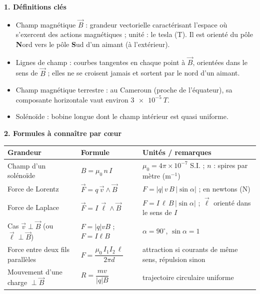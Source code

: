 \documentclass[11pt]{article}
\newcommand{\cle}[1]{{\popxbold\color{popdark}#1}}
\begin{document}
\begin{bilan}
\textbf{1. Définitions clés}
\begin{itemize}
  \item \cle{Champ magnétique} $\vec{B}$ : grandeur vectorielle caractérisant l'espace où s'exercent des actions magnétiques ; unité : le \cle{tesla} (T). Il est orienté du pôle \textbf{N}ord vers le pôle \textbf{S}ud d'un aimant (à l'extérieur).
  \item \cle{Lignes de champ} : courbes tangentes en chaque point à $\vec{B}$, orientées dans le sens de $\vec{B}$ ; elles ne se croisent jamais et sortent par le nord d'un aimant.
  \item \cle{Champ magnétique terrestre} : au Cameroun (proche de l'équateur), sa composante horizontale vaut environ $\SI{3e-5}{T}$.
  \item \cle{Solénoïde} : bobine longue dont le champ intérieur est quasi uniforme.
\end{itemize}

\textbf{2. Formules à connaître par c\oe ur}
\begin{center}
\begin{tabularx}{\linewidth}{|l|X|X|}
\hline
\rowcolor{popblueL} \textbf{Grandeur} & \textbf{Formule} & \textbf{Unités / remarques} \\
\hline
Champ d'un solénoïde & $B=\mu_0\,n\,I$ & $\mu_0=4\pi\times10^{-7}$ S.I. ; $n$ : spires par mètre ($\mathrm{m^{-1}}$) \\
\hline
Force de Lorentz & $\vec{F}=q\,\vec{v}\wedge\vec{B}$ & $F=|q|\,v\,B\,|\sin\alpha|$ ; en newtons (N) \\
\hline
Force de Laplace & $\vec{F}=I\,\vec{\ell}\wedge\vec{B}$ & $F=I\,\ell\,B\,|\sin\alpha|$ ; $\vec{\ell}$ orienté dans le sens de $I$ \\
\hline
Cas $\vec{v}\perp\vec{B}$ (ou $\vec{\ell}\perp\vec{B}$) & $F=|q|vB$ \quad ; \quad $F=I\ell B$ & $\alpha=90^{\circ}$, $\sin\alpha=1$ \\
\hline
Force entre deux fils parallèles & $F=\dfrac{\mu_0\,I_1 I_2\,\ell}{2\pi d}$ & attraction si courants de même sens, répulsion sinon \\
\hline
Mouvement d'une charge $\perp\vec{B}$ & $R=\dfrac{mv}{|q|B}$ & trajectoire circulaire uniforme \\
\hline
\end{tabularx}
\end{center}


\end{bilan}
\end{document}
